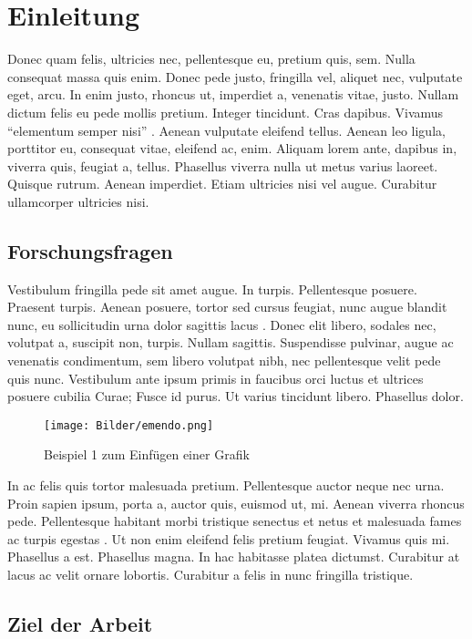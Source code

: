 \chapter{Einleitung}
Donec quam felis, ultricies nec, pellentesque eu, pretium quis, sem. Nulla consequat massa quis enim. Donec pede justo, fringilla vel, aliquet nec, vulputate eget, arcu. In enim justo, rhoncus ut, imperdiet a, venenatis vitae, justo. Nullam dictum felis eu pede mollis pretium. Integer tincidunt. Cras dapibus. Vivamus "`elementum semper nisi"' \cite{Fischer.2010b}. Aenean vulputate eleifend tellus. Aenean leo ligula, porttitor eu, consequat vitae, eleifend ac, enim. Aliquam lorem ante, dapibus in, viverra quis, feugiat a, tellus. Phasellus viverra nulla ut metus varius laoreet. Quisque rutrum. Aenean imperdiet. Etiam ultricies nisi vel augue. Curabitur ullamcorper ultricies nisi. 


\section{Forschungsfragen}
Vestibulum fringilla pede sit amet augue. In turpis. Pellentesque posuere. Praesent turpis. Aenean posuere, tortor sed cursus feugiat, nunc augue blandit nunc, eu sollicitudin urna dolor sagittis lacus \cite[S. 33-39]{Brambilla.2012}. Donec elit libero, sodales nec, volutpat a, suscipit non, turpis. Nullam sagittis. Suspendisse pulvinar, augue ac venenatis condimentum, sem libero volutpat nibh, nec pellentesque velit pede quis nunc. Vestibulum ante ipsum primis in faucibus orci luctus et ultrices posuere cubilia Curae; Fusce id purus. Ut varius tincidunt libero. Phasellus dolor.  
\begin{figure}
	\centering
		\texttt{[image: Bilder/emendo.png]}
	\caption{Beispiel 1 zum Einfügen einer Grafik}
	\label{fig:bsp1}
\end{figure}

In ac felis quis tortor malesuada pretium. Pellentesque auctor neque nec urna. Proin sapien ipsum, porta a, auctor quis, euismod ut, mi. Aenean viverra rhoncus pede. Pellentesque habitant morbi tristique senectus et netus et malesuada fames ac turpis egestas \cite{LohrRichter.1993}. Ut non enim eleifend felis pretium feugiat. Vivamus quis mi. Phasellus a est. Phasellus magna. In hac habitasse platea dictumst. Curabitur at lacus ac velit ornare lobortis. Curabitur a felis in nunc fringilla tristique. 

\section{Ziel der Arbeit}

